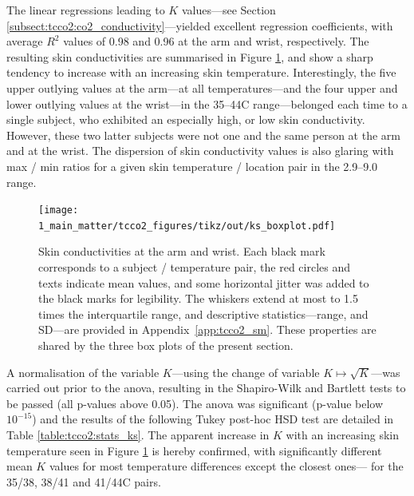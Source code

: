 The linear regressions leading to $K$ values---see Section \ref{subsect:tcco2:co2_conductivity}---yielded excellent regression coefficients, with average $R^2$ values of 0.98 and 0.96 at the arm and wrist, respectively. The resulting skin conductivities are summarised in Figure \ref{fig:tcco2:ks_boxplot}, and show a sharp tendency to increase with an increasing skin temperature. Interestingly, the five upper outlying values at the arm---at all temperatures---and the four upper and lower outlying values at the wrist---in the 35--44{\degree}C range---belonged each time to a single subject, who exhibited an especially high, or low skin conductivity. However, these two latter subjects were not one and the same person at the arm and at the wrist. The dispersion of skin conductivity values is also glaring with max / min ratios for a given skin temperature / location pair in the 2.9--9.0 range.

\begin{figure}
	\centering
	\texttt{[image: 1\_main\_matter/tcco2\_figures/tikz/out/ks\_boxplot.pdf]}
	\caption[Skin conductivities at the arm and wrist (box plots).]{Skin conductivities at the arm and wrist. Each black mark corresponds to a subject / temperature pair, the red circles and texts indicate mean values, and some horizontal jitter was added to the black marks for legibility. The whiskers extend at most to 1.5 times the interquartile range, and descriptive statistics---range, and SD---are provided in Appendix~\ref{app:tcco2_sm}. These properties are shared by the three box plots of the present section.}\label{fig:tcco2:ks_boxplot}
\end{figure}

A normalisation of the variable $K$---using the change of variable $K\mapsto\sqrt{K}$---was carried out prior to the \gls{anova}, resulting in the Shapiro-Wilk and Bartlett tests to be passed (all p-values above 0.05). The \gls{anova} was significant (p-value below $10^{-15}$) and the results of the following Tukey post-hoc HSD test are detailed in Table \ref{table:tcco2:stats_ks}. The apparent increase in $K$ with an increasing skin temperature seen in Figure \ref{fig:tcco2:ks_boxplot} is hereby confirmed, with significantly different mean $K$ values for most temperature differences except the closest ones---\ie{} for the 35/38, 38/41 and 41/44{\degree}C pairs.

